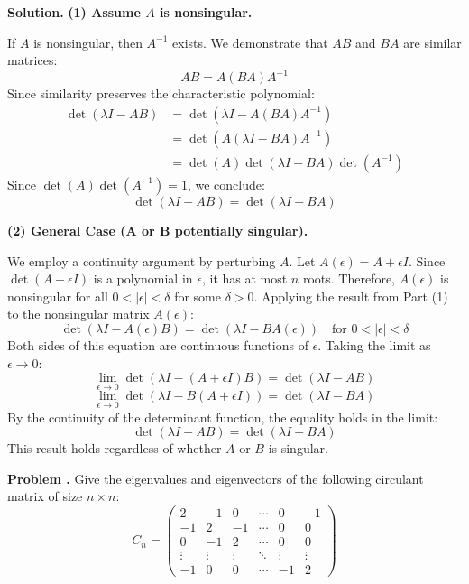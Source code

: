 \documentclass[12pt,a4paper,oneside]{article}
\newcounter{problemname}
\newenvironment{problem}
  {\begin{shaded}\stepcounter{problemname}\par\noindent\textbf{Problem \arabic{problemname}.
}\newline}
  {\end{shaded}\par}
\newenvironment{solution}
  {\par\noindent\textbf{Solution. }\newline}
  {\par}
\begin{document}
\begin{solution}
\textbf{(1) Assume $A$ is nonsingular.}

If $A$ is nonsingular, then $A^{-1}$ exists. We demonstrate that $AB$ and $BA$ are similar matrices:
$$AB = A (BA) A^{-1}$$
Since similarity preserves the characteristic polynomial:
\begin{align*} \det(\lambda I - AB) &= \det(\lambda I - A (BA) A^{-1}) \\ &= \det(A (\lambda I - BA) A^{-1}) \\ &= \det(A) \det(\lambda I - BA) \det(A^{-1}) \end{align*}
Since $\det(A) \det(A^{-1}) = 1$, we conclude:
$$\det(\lambda I - AB) = \det(\lambda I - BA)$$

\textbf{(2) General Case (A or B potentially singular).}

We employ a continuity argument by perturbing $A$. Let $A(\epsilon) = A + \epsilon I$. Since $\det(A+\epsilon I)$ is a polynomial in $\epsilon$, it has at most $n$ roots. Therefore, $A(\epsilon)$ is nonsingular for all $0 < |\epsilon| < \delta$ for some $\delta > 0$.
Applying the result from Part (1) to the nonsingular matrix $A(\epsilon)$:
$$ \det(\lambda I - A(\epsilon) B) = \det(\lambda I - B A(\epsilon)) \quad \text{for } 0 < |\epsilon| < \delta $$
Both sides of this equation are continuous functions of $\epsilon$. Taking the limit as $\epsilon \to 0$:
$$\lim_{\epsilon \to 0} \det(\lambda I - (A + \epsilon I) B) = \det(\lambda I - AB)$$
$$\lim_{\epsilon \to 0} \det(\lambda I - B (A + \epsilon I)) = \det(\lambda I - BA)$$
By the continuity of the determinant function, the equality holds in the limit:
$$\det(\lambda I - AB) = \det(\lambda I - BA)$$
This result holds regardless of whether $A$ or $B$ is singular.
\end{solution}

\newpage
\begin{problem}
Give the eigenvalues and eigenvectors of the following circulant matrix of size $n\times n:$
$$ C_n = \begin{pmatrix} 2 & -1 & 0 & \cdots & 0 & -1 \\ -1 & 2 & -1 & \cdots & 0 & 0 \\ 0 & -1 & 2 & \cdots & 0 & 0 \\ \vdots & \vdots & \vdots & \ddots & \vdots & \vdots \\ -1 & 0 & 0 & \cdots & -1 & 2 \end{pmatrix} $$
\end{problem}
\end{document}
